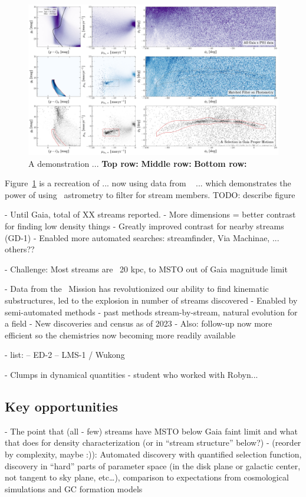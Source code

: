 \documentclass[final,5p,times,twocolumn,authoryear]{elsarticle}
\begin{document}
\begin{figure}[t!]
\begin{center}
\includegraphics[width=1\textwidth]{gd1-filter-demo.pdf}
\end{center}
\caption{%
A demonstration ...
\textbf{Top row:}
\textbf{Middle row:}
\textbf{Bottom row:}
\label{fig:gd1-demo}
}
\end{figure}

Figure~\ref{fig:gd1-demo} is a recreation of ... now using data from \gaia\  ...
which demonstrates the power of using \gaia\ astrometry to filter for stream members.
TODO: describe figure



- Until Gaia, total of XX streams reported.
- More dimensions = better contrast for finding low density things
- Greatly improved contrast for nearby streams (GD-1)
- Enabled more automated searches: streamfinder, Via Machinae, ... others??

- Challenge: Most streams are ~20 kpc, to MSTO out of Gaia magnitude limit

- Data from the \gaia\ Mission has revolutionized our ability to find kinematic substructures, led to the explosion in number of streams discovered
- Enabled by semi-automated methods - past methods stream-by-stream, natural evolution for a field
- New discoveries and census as of 2023
- Also: follow-up now more efficient so the chemistries now becoming more readily available

- list:
-- ED-2
-- LMS-1 / Wukong

- Clumps in dynamical quantities - student who worked with Robyn...


\subsection{Key opportunities}
- The point that (all - few) streams have MSTO below Gaia faint limit and what that does for density characterization (or in “stream structure” below?)
- (reorder by complexity, maybe :)): Automated discovery with quantified selection function, discovery in “hard” parts of parameter space (in the disk plane or galactic center, not tangent to sky plane, etc…), comparison to expectations from cosmological simulations and GC formation models
\end{document}
